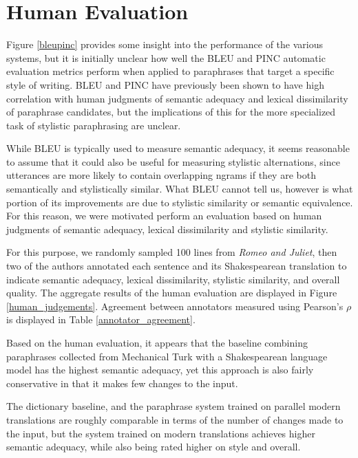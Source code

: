 \documentclass[10pt,a5paper,twoside]{article}
\begin{document}
\section{Human Evaluation}
\label{human_evaluation}
Figure \ref{bleupinc} provides some insight into the performance of the various systems, but it is initially unclear how well the BLEU and PINC
automatic evaluation metrics perform when applied to paraphrases that target a specific style of writing.  BLEU and PINC have previously
been shown to have high correlation with human judgments of semantic adequacy and lexical dissimilarity of paraphrase candidates, 
but the implications of this for the more specialized task of stylistic paraphrasing are unclear.

While BLEU is typically used to measure semantic adequacy, it seems reasonable to assume that it 
could also be useful for measuring stylistic alternations, since utterances
are more likely to contain overlapping ngrams if they are both semantically and stylistically similar.  What BLEU cannot tell us, however
is what portion of its improvements are due to stylistic similarity or semantic equivalence.  For this reason, we were motivated perform
an evaluation based on human judgments of semantic adequacy, lexical dissimilarity and stylistic similarity.

For this purpose, we randomly sampled 100 lines from {\em Romeo and Juliet}, then two of the authors annotated each sentence and its Shakespearean
translation to indicate semantic adequacy, lexical dissimilarity, stylistic similarity, and overall quality.
The aggregate results of the human evaluation are displayed in Figure \ref{human_judgements}.  Agreement between annotators
measured using Pearson's $\rho$ is displayed in Table \ref{annotator_agreement}.

Based on the human evaluation, it appears that the baseline combining paraphrases collected from Mechanical Turk \cite{chen11} with
a Shakespearean language model has the highest semantic adequacy, yet this approach is also fairly conservative in that it makes few changes to the input.

The dictionary baseline, and the paraphrase system trained on parallel modern translations are roughly comparable in terms of 
the number of changes made to the input, but the system trained on modern translations achieves higher semantic adequacy, while also being rated higher on style and overall.
\end{document}
